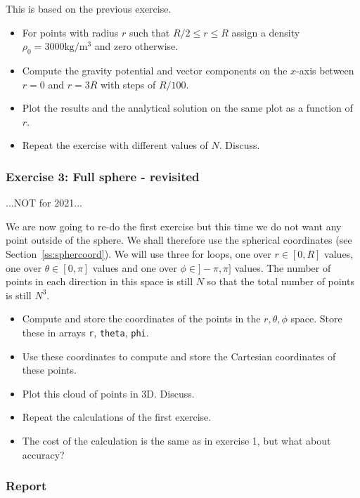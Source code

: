 This is based on the previous exercise. 
\begin{itemize}
\item For points with radius $r$ such that $R/2 \le r \le R$ assign a density $\rho_0=3000\si{\kilo\gram\per\cubic\metre}$ 
and zero otherwise.
\item Compute the gravity potential and vector components on the $x$-axis between $r=0$ and $r=3R$ 
with steps of $R/100$.
\item Plot the results and the analytical solution on the same plot as a function of $r$.
\item Repeat the exercise with different values of $N$. Discuss.
\end{itemize}




\subsubsection*{Exercise 3: Full sphere - revisited}

...NOT for 2021...

We are now going to re-do the first exercise but this time we do not want any point outside of the sphere. 
We shall therefore use the spherical coordinates (see Section~\ref{ss:sphercoord}).
We will use three for loops, one over $r\in[0,R]$ values, 
one over $\theta\in[0,\pi]$ values and one over $\phi\in]-\pi,\pi]$ values. The number 
of points in each direction in this space is still $N$ so that the total number of points is
still $N^3$.

\begin{itemize}
\item Compute and store the coordinates of the points in the $r,\theta,\phi$ space. Store 
these in arrays {\tt r}, {\tt theta}, {\tt phi}.
\item Use these coordinates to compute and store the Cartesian coordinates of these points. 
\item Plot this cloud of points in 3D. Discuss.
\item Repeat the calculations of the first exercise.
\item The cost of the calculation is the same as in exercise 1, but what about accuracy?
\end{itemize}


\subsubsection*{Report}

